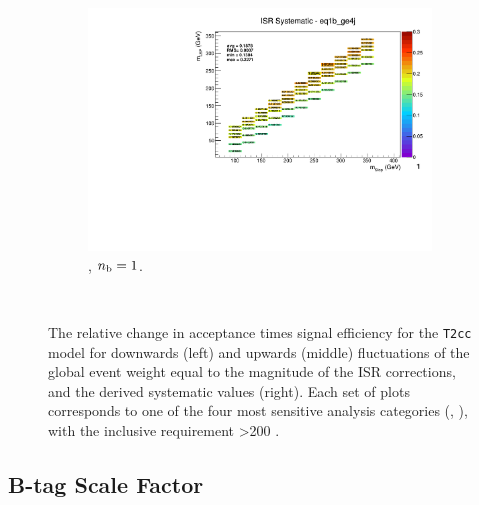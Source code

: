 \begin{figure}[ht!]
\begin{subfigure}[b]{0.32\textwidth}
    \includegraphics[width=\textwidth, page=1]{Figs/sms/t2cc/v37/systs_v2/T2cc_ISR_eq1b_ge4j.pdf}
    \caption{\njhigh, $n_{\text{b}} = 1$.}
  \end{subfigure}\\
  \caption{The relative change in acceptance times signal efficiency for the
  \texttt{T2cc} model for downwards (left) and upwards (middle) fluctuations
  of the global event weight equal to the magnitude of the ISR corrections,
  and the derived systematic values (right). Each set of plots corresponds
  to one of the four most sensitive analysis categories (\nb, \nj), with the
  inclusive requirement \HT>200 \gev.}
  \label{fig:sms-isr-t2cc}
\end{figure}


\newpage
\subsection*{B-tag Scale Factor}
\label{sec:t2cc_btag_plots}

